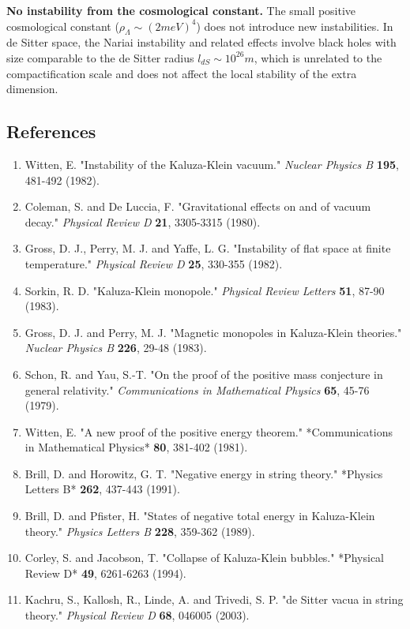 \documentclass[aps,prd,preprint,superscriptaddress,longbibliography,floatfix]{revtex4-2}
\theoremstyle{remark}
\begin{document}
\textbf{No instability from the cosmological constant.} The small positive cosmological constant ($\rho_\Lambda \sim  (2 meV)^{4}$) does not introduce new instabilities. In de Sitter space, the Nariai instability and related effects involve black holes with size comparable to the de Sitter radius $l_{dS} \sim  10^{26} m$, which is unrelated to the compactification scale and does not affect the local stability of the extra dimension.



\subsection{References}


\begin{enumerate}
  \item Witten, E. "Instability of the Kaluza-Klein vacuum." \textit{Nuclear Physics B} \textbf{195}, 481-492 (1982).
  \item Coleman, S. and De Luccia, F. "Gravitational effects on and of vacuum decay." \textit{Physical Review D} \textbf{21}, 3305-3315 (1980).
  \item Gross, D. J., Perry, M. J. and Yaffe, L. G. "Instability of flat space at finite temperature." \textit{Physical Review D} \textbf{25}, 330-355 (1982).
  \item Sorkin, R. D. "Kaluza-Klein monopole." \textit{Physical Review Letters} \textbf{51}, 87-90 (1983).
  \item Gross, D. J. and Perry, M. J. "Magnetic monopoles in Kaluza-Klein theories." \textit{Nuclear Physics B} \textbf{226}, 29-48 (1983).
  \item Schon, R. and Yau, S.-T. "On the proof of the positive mass conjecture in general relativity." \textit{Communications in Mathematical Physics} \textbf{65}, 45-76 (1979).
  \item Witten, E. "A new proof of the positive energy theorem." *Communications in Mathematical Physics* \textbf{80}, 381-402 (1981).
  \item Brill, D. and Horowitz, G. T. "Negative energy in string theory." *Physics Letters B* \textbf{262}, 437-443 (1991).
  \item Brill, D. and Pfister, H. "States of negative total energy in Kaluza-Klein theory." \textit{Physics Letters B} \textbf{228}, 359-362 (1989).
  \item Corley, S. and Jacobson, T. "Collapse of Kaluza-Klein bubbles." *Physical Review D* \textbf{49}, 6261-6263 (1994).
  \item Kachru, S., Kallosh, R., Linde, A. and Trivedi, S. P. "de Sitter vacua in string theory." \textit{Physical Review D} \textbf{68}, 046005 (2003).
\end{enumerate}
\end{document}
